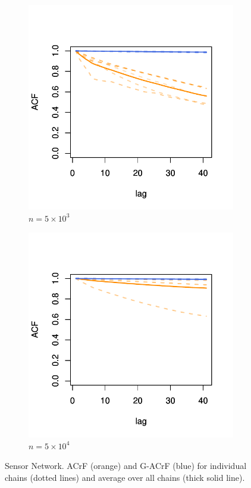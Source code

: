\documentclass[11pt]{article}
\theoremstyle{remark}
\begin{document}
\begin{figure}[h]
    \centering
    \begin{subfigure}[h]{.45\textwidth}
      \centering
      \includegraphics[width = \textwidth]{plots/sensor-acf_n5e3.pdf}
      \caption{$n = 5 \times 10^3$}
      \label{subfig:sensor-acf_5e3}
    \end{subfigure}
    \begin{subfigure}[h]{.45\textwidth}
      \centering
      \includegraphics[width = \textwidth]{plots/sensor-acf_n5e4.pdf}
      \caption{$n = 5 \times 10^4$}
      \label{subfig:sensor-acf_5e4}
    \end{subfigure}
    \caption{Sensor Network. ACrF (orange) and G-ACrF (blue) for individual chains (dotted lines) and average over all chains (thick solid line).}
    \label{fig:sensor-acf}
\end{figure}
\end{document}
